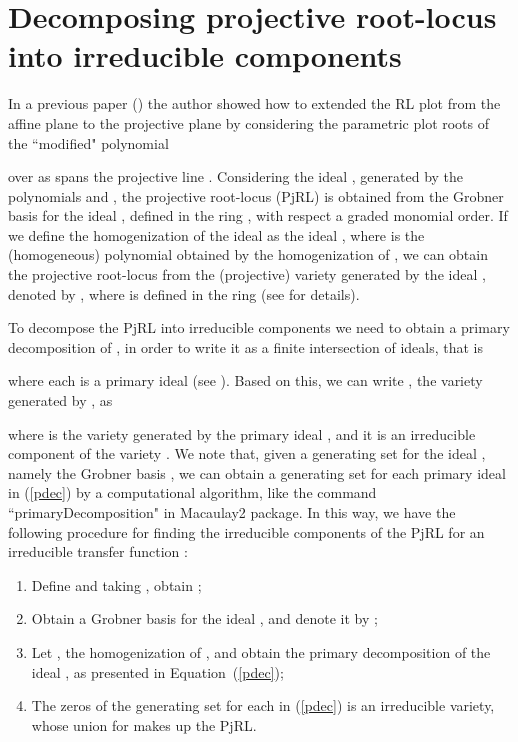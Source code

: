 \documentclass{article}
\begin{document}
\section{Decomposing projective root-locus into irreducible components}\label{ic}

In a previous paper (\cite{pjrl}) the author showed how to extended the RL plot 
from the affine plane  to the projective plane 
by considering the parametric plot roots of the ``modified" polynomial 

over  as  spans the 
projective line . Considering the ideal , 
generated by the polynomials 
 and , 
the projective root-locus (PjRL) is obtained from the
Grobner basis  for the ideal , 
defined in the ring , 
with respect a graded monomial order. If we define the homogenization
of the ideal  as the ideal 
, where  is the (homogeneous)
polynomial obtained by the homogenization of , we can obtain the projective root-locus
from the (projective) variety generated by the ideal , denoted by ,
where  is defined in the ring 
 (see \cite{pjrl} for details).

To decompose the PjRL into irreducible components we need to obtain 
a primary decomposition of , in order to write it  as a
finite intersection of ideals, that is

where each  is a primary ideal (see \cite[Thm. 7.13]{am}).
Based on this, we can write , the variety generated
by , as 

where  is the variety generated by the primary ideal , and it is
an irreducible component of the variety . We note that, given a generating set for the
ideal , namely the Grobner basis , we can 
obtain a generating set for each primary ideal  in (\ref{pdec}) by a computational algorithm,
like the command ``primaryDecomposition" in Macaulay2 package. In this way, we have the
following procedure for finding the irreducible components of the PjRL for an irreducible 
transfer function :
\begin{enumerate}
\item Define  and taking , obtain ;
\item Obtain a Grobner basis for the ideal , and denote it by ;
\item Let , the homogenization of , and obtain the 
primary decomposition of the ideal , as presented in Equation~(\ref{pdec});
\item The zeros of the generating set for each  in (\ref{pdec}) is an irreducible variety, 
whose union for  makes up the PjRL.

\end{enumerate}
\end{document}
